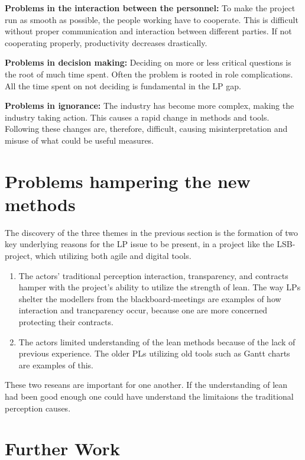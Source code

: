 {\bf Problems in the interaction between the personnel:} To make the project run as smooth as possible, the people working have to cooperate. This is difficult without proper communication and interaction between different parties. If not cooperating properly, productivity decreases drastically.

{\bf Problems in decision making:} Deciding on more or less critical questions is the root of much time spent. Often the problem is rooted in role complications. All the time spent on not deciding is fundamental in the LP gap.

{\bf Problems in ignorance:} The industry has become more complex, making the industry taking action. This causes a rapid change in methods and tools. Following these changes are, therefore, difficult, causing misinterpretation and misuse of what could be useful measures.

\section{Problems hampering the new methods} \label{sec:rq2}
The discovery of the three themes in the previous section is the formation of two key underlying reasons for the LP issue to be present, in a project like the LSB-project, which utilizing both agile and digital tools. 

\begin{enumerate}
    \item The actors' traditional perception interaction, transparency, and contracts hamper with the project's ability to utilize the strength of lean. The way LPs shelter the modellers from the blackboard-meetings are examples of how interaction and trancparency occur, because one are more concerned protecting their contracts.
    \item The actors limited understanding of the lean methods because of the lack of previous experience. The older PLs utilizing old tools such as Gantt charts are examples of this. 
\end{enumerate}

These two reseans are important for one another. If the understanding of lean had been good enough one could have understand the limitaions the traditional perception causes.

\section{Further Work} \label{sec:further_research}


\cleardoublepage